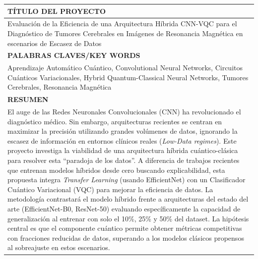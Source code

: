 \documentclass[12pt,letterpaper]{article}
\begin{document}
    \begin{longtable}{|p{\dimexpr\textwidth-2\tabcolsep-2\arrayrulewidth}|}
        \hline
        \rowcolor{lightgray}\centering\arraybackslash\textbf{TÍTULO DEL PROYECTO} \\\hline
        Evaluación de la Eficiencia de una Arquitectura Híbrida CNN-VQC para el Diagnóstico de Tumores Cerebrales en Imágenes de Resonancia Magnética en escenarios de Escasez de Datos
        \\\hline
        \rowcolor{lightgray}\centering\arraybackslash\textbf{PALABRAS CLAVES/KEY WORDS} \\\hline
        Aprendizaje Automático Cuántico,  Convolutional Neural Networks, Circuitos Cuánticos Variacionales, Hybrid Quantum-Classical Neural Networks, Tumores Cerebrales, Resonancia Magnética \\\hline
        \rowcolor{lightgray}\centering\arraybackslash\textbf{RESUMEN} \\\hline
        El auge de las Redes Neuronales Convolucionales (CNN) ha revolucionado el diagnóstico médico. Sin embargo, arquitecturas recientes se centran en maximizar la precisión utilizando grandes volúmenes de datos, ignorando la escasez de información en entornos clínicos reales (\textit{Low-Data regimes}).
        Este proyecto investiga la viabilidad de una arquitectura híbrida cuántico-clásica para resolver esta ``paradoja de los datos''.
        A diferencia de trabajos recientes que entrenan modelos híbridos desde cero buscando explicabilidad, esta propuesta integra \textit{Transfer Learning} (usando EfficientNet) con un Clasificador Cuántico Variacional (VQC) para mejorar la eficiencia de datos.
        La metodología contrastará el modelo híbrido frente a arquitecturas del estado del arte (EfficientNet-B0, ResNet-50) evaluando específicamente la capacidad de generalización al entrenar con solo el 10\%, 25\% y 50\% del dataset.
        La hipótesis central es que el componente cuántico permite obtener métricas competitivas con fracciones reducidas de datos, superando a los modelos clásicos propensos al sobreajuste en estos escenarios.
        \\\hline
    \end{longtable}
    \setcounter{table}{0}

    \hypersetup{pageanchor=false}
\end{document}

